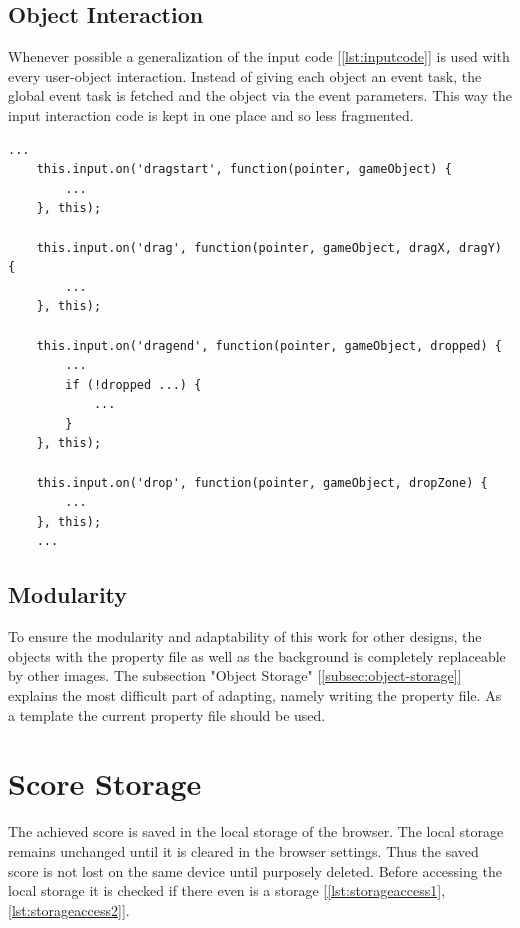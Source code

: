\subsection{Object Interaction}\label{subsec:object-interaction}
Whenever possible a generalization of the input code [\ref{lst:inputcode}] is used with every user-object interaction.
Instead of giving each object an event task, the global event task is fetched and the object via the event parameters.
This way the input interaction code is kept in one place and so less fragmented.

\begin{lstlisting}[style=TypeScript, caption={Input code}, label={lst:inputcode}]
    ...
    this.input.on('dragstart', function(pointer, gameObject) {
        ...
    }, this);

    this.input.on('drag', function(pointer, gameObject, dragX, dragY) {
        ...
    }, this);

    this.input.on('dragend', function(pointer, gameObject, dropped) {
        ...
        if (!dropped ...) {
            ...
        }
    }, this);

    this.input.on('drop', function(pointer, gameObject, dropZone) {
        ...
    }, this);
    ...
\end{lstlisting}

\subsection{Modularity}\label{subsec:modularity}
To ensure the modularity and adaptability of this work for other designs,
the objects with the property file as well as the background is completely replaceable by other images.
The subsection "Object Storage" [\ref{subsec:object-storage}] explains the most difficult part of adapting, namely
writing the property file. As a template the current property file should be used.

\section{Score Storage}\label{sec:scorestorage}
The achieved score is saved in the local storage\cite{webstorage} of the browser.
The local storage remains unchanged until it is cleared in the browser settings.
Thus the saved score is not lost on the same device until purposely deleted.
Before accessing the local storage it is checked if there even is a storage [\ref{lst:storageaccess1}, \ref{lst:storageaccess2}].

